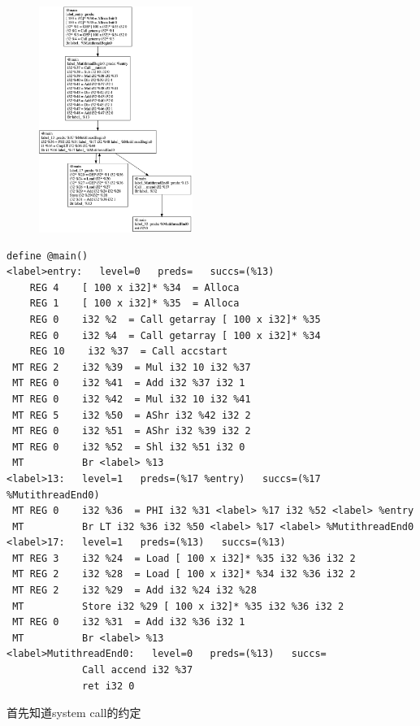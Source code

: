 \documentclass[a4paper]{exam}
\theoremstyle{definition}
\begin{document}
\begin{figure}[htbp]
  \centering
  \includegraphics[width=5cm]{./img/1.png}
\end{figure}

\begin{verbatim}
define @main()
<label>entry:   level=0   preds=   succs=(%13)
    REG 4    [ 100 x i32]* %34  = Alloca 
    REG 1    [ 100 x i32]* %35  = Alloca 
    REG 0    i32 %2  = Call getarray [ 100 x i32]* %35 
    REG 0    i32 %4  = Call getarray [ 100 x i32]* %34 
    REG 10    i32 %37  = Call accstart 
 MT REG 2    i32 %39  = Mul i32 10 i32 %37 
 MT REG 0    i32 %41  = Add i32 %37 i32 1 
 MT REG 0    i32 %42  = Mul i32 10 i32 %41 
 MT REG 5    i32 %50  = AShr i32 %42 i32 2 
 MT REG 0    i32 %51  = AShr i32 %39 i32 2 
 MT REG 0    i32 %52  = Shl i32 %51 i32 0 
 MT          Br <label> %13 
<label>13:   level=1   preds=(%17 %entry)   succs=(%17 %MutithreadEnd0)
 MT REG 0    i32 %36  = PHI i32 %31 <label> %17 i32 %52 <label> %entry 
 MT          Br LT i32 %36 i32 %50 <label> %17 <label> %MutithreadEnd0 
<label>17:   level=1   preds=(%13)   succs=(%13)
 MT REG 3    i32 %24  = Load [ 100 x i32]* %35 i32 %36 i32 2 
 MT REG 2    i32 %28  = Load [ 100 x i32]* %34 i32 %36 i32 2 
 MT REG 2    i32 %29  = Add i32 %24 i32 %28 
 MT          Store i32 %29 [ 100 x i32]* %35 i32 %36 i32 2 
 MT REG 0    i32 %31  = Add i32 %36 i32 1 
 MT          Br <label> %13 
<label>MutithreadEnd0:   level=0   preds=(%13)   succs=
             Call accend i32 %37 
             ret i32 0 
\end{verbatim}
首先知道system call的约定
\end{document}
